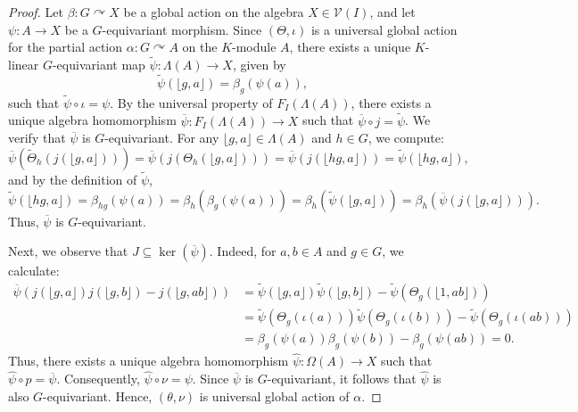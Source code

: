\documentclass[11pt]{amsart}
\numberwithin{equation}{section}
\theoremstyle{definition}
\theoremstyle{remark}
\begin{document}
\begin{proof}
    Let \(\beta: G \curvearrowright X\) be a global action on the algebra \(X \in \mathcal{V}(I)\), and let \(\psi: A \to X\) be a \(G\)-equivariant morphism.
    Since \((\Theta, \iota)\) is a universal global action for the partial action \(\alpha: G \curvearrowright A\) on the \(K\)-module \(A\), there exists a unique \(K\)-linear \(G\)-equivariant map \(\widetilde{\psi}: \Lambda(A) \to X\), given by 
    \[
        \widetilde{\psi}(\lfloor g, a \rfloor) = \beta_g(\psi(a)),
    \]
    such that \(\widetilde{\psi} \circ \iota = \psi\).
    By the universal property of \(F_I(\Lambda(A))\), there exists a unique algebra homomorphism \(\overline{\psi}: F_I(\Lambda(A)) \to X\) such that \(\overline{\psi} \circ j = \widetilde{\psi}\).
    We  verify that \(\overline{\psi}\) is \(G\)-equivariant.
    For any \(\lfloor g, a \rfloor \in \Lambda(A)\) and \(h \in G\), we compute:
    \[
        \overline{\psi}(\widetilde{\Theta}_h(j(\lfloor g, a \rfloor))) 
        = \overline{\psi}(j(\Theta_h(\lfloor g, a \rfloor))) 
        = \overline{\psi}(j(\lfloor hg, a \rfloor)) 
        = \widetilde{\psi}(\lfloor hg, a \rfloor),
    \]
    and by the definition of \(\widetilde{\psi}\),
    \[
        \widetilde{\psi}(\lfloor hg, a \rfloor) = \beta_{hg}(\psi(a)) = \beta_h(\beta_g(\psi(a))) = \beta_h(\widetilde{\psi}(\lfloor g, a \rfloor)) = \beta_h(\overline{\psi}(j(\lfloor g, a \rfloor))).
    \]
    Thus, \(\overline{\psi}\) is \(G\)-equivariant.

    Next, we observe that \(J \subseteq \ker(\overline{\psi})\). Indeed, for \(a, b \in A\) and \(g \in G\), we calculate:
    \begin{align*}
        \overline{\psi}(j(\lfloor g, a \rfloor)j(\lfloor g, b \rfloor) - j(\lfloor g, ab \rfloor)) 
        &= \widetilde{\psi}(\lfloor g, a \rfloor)\widetilde{\psi}(\lfloor g, b \rfloor) - \widetilde{\psi}(\Theta_g(\lfloor 1, ab \rfloor)) \\
        &= \widetilde{\psi}(\Theta_g(\iota(a)))\widetilde{\psi}(\Theta_g(\iota(b))) - \widetilde{\psi}(\Theta_g(\iota(ab))) \\
        &= \beta_g(\psi(a))\beta_g(\psi(b)) - \beta_g(\psi(ab)) = 0.
    \end{align*}
    Thus, there exists a unique algebra homomorphism \(\widehat{\psi}: \Omega(A) \to X\) such that \(\widehat{\psi} \circ p = \overline{\psi}\). Consequently, \(\widehat{\psi} \circ \nu = \psi\).
    Since  \(\overline{\psi}\)  is  \(G\)-equivariant, it follows that \(\widehat{\psi}\) is also \(G\)-equivariant.  Hence, \((\theta, \nu)\) is  universal global action of \(\alpha\).
\end{proof}
\end{document}
